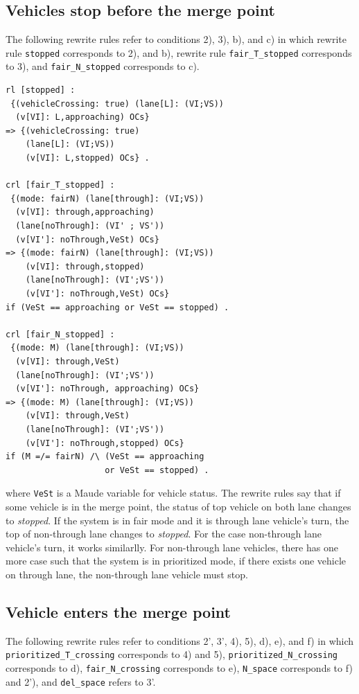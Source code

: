 \documentclass[10pt, conference, compsocconf]{IEEEtran}
\begin{document}
\subsection{Vehicles stop before the merge point}
The following rewrite rules refer to conditions 2), 3), b), and c) in which 
rewrite rule \verb!stopped! corresponds to 2), and b), rewrite rule 
\verb!fair_T_stopped! corresponds to 3), and \verb!fair_N_stopped! corresponds
to c).
\begin{small}
  \begin{verbatim}
rl [stopped] : 
 {(vehicleCrossing: true) (lane[L]: (VI;VS)) 
  (v[VI]: L,approaching) OCs} 
=> {(vehicleCrossing: true) 
    (lane[L]: (VI;VS)) 
    (v[VI]: L,stopped) OCs} .

crl [fair_T_stopped] : 
 {(mode: fairN) (lane[through]: (VI;VS)) 
  (v[VI]: through,approaching) 
  (lane[noThrough]: (VI' ; VS')) 
  (v[VI']: noThrough,VeSt) OCs} 
=> {(mode: fairN) (lane[through]: (VI;VS)) 
    (v[VI]: through,stopped)
    (lane[noThrough]: (VI';VS')) 
    (v[VI']: noThrough,VeSt) OCs} 
if (VeSt == approaching or VeSt == stopped) .

crl [fair_N_stopped] : 
 {(mode: M) (lane[through]: (VI;VS)) 
  (v[VI]: through,VeSt) 
  (lane[noThrough]: (VI';VS')) 
  (v[VI']: noThrough, approaching) OCs} 
=> {(mode: M) (lane[through]: (VI;VS)) 
    (v[VI]: through,VeSt)
    (lane[noThrough]: (VI';VS')) 
    (v[VI']: noThrough,stopped) OCs} 
if (M =/= fairN) /\ (VeSt == approaching 
                    or VeSt == stopped) .    
  \end{verbatim}
\end{small}

\noindent where \verb!VeSt! is a Maude variable for vehicle status.
The rewrite rules say that if some vehicle is in the merge point,
the status of top vehicle on both lane changes to \textit{stopped}.
If the system is in fair mode and it is through lane vehicle's turn,
the top of non-through lane changes to \textit{stopped}. For the case 
non-through lane vehicle's turn, it works similarlly.
For non-through lane vehicles, there has one more case such that the system
is in prioritized mode, if there exists one vehicle on through lane, 
the non-through lane vehicle must stop.

\subsection{Vehicle enters the merge point}
The following rewrite rules refer to conditions 2', 3', 4), 5), d), e), and f)
in which \verb!prioritized_T_crossing! corresponds to 4) and 5), \verb!prioritized_N_crossing!
corresponds to d), \verb!fair_N_crossing! corresponds to e), \verb!N_space! 
corresponds to f) and 2'), and \verb!del_space! refers to 3'.
\end{document}
